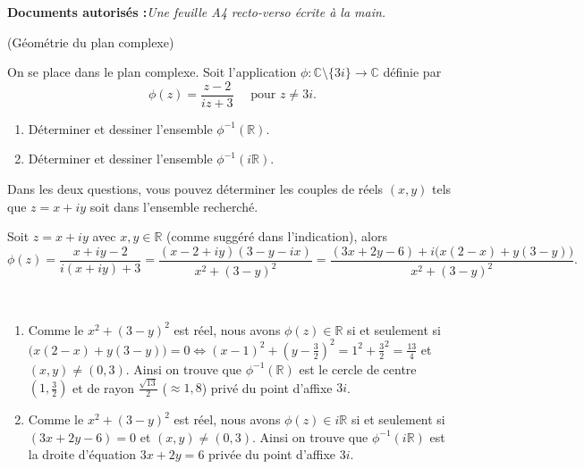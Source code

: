 \documentclass[a4paper,12pt,reqno]{amsart}
\begin{document}
\ifsolutions\else
\textbf{Documents autorisés :}\textit{Une feuille A4 recto-verso écrite à la main.}

\vspace{28mm}
\tsvp
\fi


\begin{exo} (Géométrie du plan complexe)

On se place dans le plan complexe. Soit l'application $\phi : \mathbb{C}\setminus \{3i\} \rightarrow \mathbb{C}$ définie par
\[
  \phi(z) = \frac{z-2}{iz+3}\quad\text{ pour } z\neq3i.
\]

  \begin{enumerate}
    \item Déterminer et dessiner l'ensemble $\phi^{-1}(\mathbb{R})$.
    \item Déterminer et dessiner l'ensemble $\phi^{-1}(i\mathbb{R})$.
  \end{enumerate}
  \begin{indication}
    Dans les deux questions, vous pouvez déterminer les couples de réels $(x,y)$ tels que $z = x+iy$ soit dans l'ensemble recherché.
  \end{indication}

\end{exo}

\begin{solution}
  Soit $z=x+iy$ avec $x,y \in \mathbb{R}$ (comme suggéré dans l'indication), alors
  \[
    \phi(z) = \frac{x+iy-2}{i(x+iy)+3} = \frac{(x-2+iy)(3-y-ix)}{x^{2}+(3-y)^{2}} = \frac{(3x+2y-6) + i \big(x(2-x)+y(3-y)\big)}{x^{2}+(3-y)^{2}}.
  \]

    ~
  \vspace{-14mm}

  \begin{enumerate}
    \item Comme le $x^{2}+(3-y)^{2}$ est réel, nous avons $\phi(z) \in \mathbb{R}$ si et seulement si $\big(x(2-x)+y(3-y)\big) = 0 \iff (x-1)^{2}+(y- \frac{3}{2})^{2} = 1^{2}+\frac{3}{2}^{2} = \frac{13}{4}$ et $(x,y) \neq (0,3)$. Ainsi on trouve que $\phi^{-1}(\mathbb{R})$ est le cercle de centre $(1,\frac{3}{2})$ et de rayon $\frac{\sqrt{13}}{2}$ ($\approx 1,8$) privé du point d'affixe $3i$.
    \item Comme le $x^{2}+(3-y)^{2}$ est réel, nous avons $\phi(z) \in i\mathbb{R}$ si et seulement si $(3x+2y-6) = 0$ et $(x,y) \neq (0,3)$. Ainsi on trouve que $\phi^{-1}(i\mathbb{R})$ est la droite d'équation $3x+2y=6$ privée du point d'affixe $3i$.
  \end{enumerate}
\end{solution}
\end{document}
